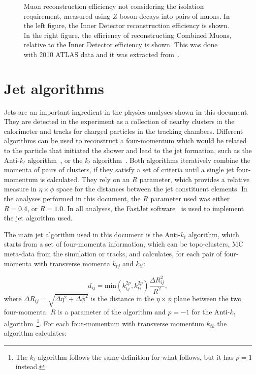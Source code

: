 \begin{figure}
\centering
{}
\caption{Muon reconstruction efficiency not considering the isolation requirement, measured using $Z$-boson decays into pairs of muons. In the left figure, the Inner Detector reconstruction efficiency is shown. In the right figure, the efficiency of reconstructing Combined Muons, relative to the Inner Detector efficiency is shown. This was done with 2010 ATLAS data and it was extracted from~\cite{muonperf2010}.}
\label{fig:muon_eff}
\end{figure}

\section{Jet algorithms}
\label{sec:atlas_jet}

Jets are an important ingredient in the physics analyses shown in this document. They are detected in the experiment
as a collection of nearby clusters in the calorimeter and tracks for charged
particles in the tracking chambers. Different algorithms can be used to reconstruct a four-momentum which would be related to the particle that initiated the shower and lead
to the jet formation, such as the Anti-$k_t$ algorithm~\cite{antiktalgo}, or the $k_t$ algorithm~\cite{ktalgo}. Both algorithms iteratively combine the
momenta of pairs of clusters, if they satisfy a set of criteria until a single jet four-momentum is calculated. They rely on an $R$ parameter, which provides
a relative measure in $\eta \times \phi$ space for the distances between the jet constituent elements. In the analyses performed in this document, the $R$ parameter used
was either $R=0.4$, or $R=1.0$. In all analyses, the FastJet software~\cite{fastjet} is used to implement the jet algorithm used.

The main jet algorithm used in this document is the Anti-$k_t$ algorithm, which starts from a set of four-momenta information, which can be
topo-clusters, MC meta-data from the simulation or tracks, and calculates, for each pair of four-momenta with transverse momenta $k_{tj}$ and $k_{ti}$:

\begin{equation}
\displaystyle
d_{ij} = \textrm{min}(k_{tj}^{2p}, k_{ti}^{2p}) \frac{\Delta R_{ij}^2}{R^2},
\label{eq:jet_dij}
\end{equation}
where $\Delta R_{ij} = \sqrt{\Delta \eta^2 + \Delta \phi^2}$
is
the distance in the $\eta \times \phi$ plane between the two four-momenta. $R$ is a parameter of the algorithm and $p = -1$ for the Anti-$k_t$ algorithm~\footnote{The $k_t$
algorithm follows the same definition for what follows, but it has $p = 1$ instead.}. For each four-momentum with transverse momentum $k_{tk}$
the algorithm calculates:

